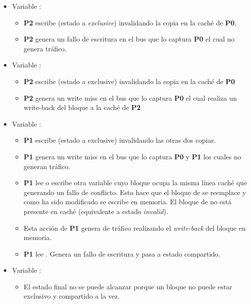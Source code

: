 \begin{itemize}

\item Variable :
  \begin{itemize}
    \item \textbf{\textbf{P2}}  escribe  (estado a \emph{exclusive}) invalidando la copia en la caché de \textbf{P0}.
    \item \textbf{P2} genera un fallo de escritura en el bus que lo captura \textbf{P0} el cual no genera tráfico.
  \end{itemize}

\item Variable :
  \begin{itemize}
    \item \textbf{P2}  escribe   (estado a exclusive) invalidando la copia en la caché de \textbf{P0}
    \item \textbf{P2} genera un write miss en el bus que lo captura \textbf{P0} el cual realiza un write-back del bloque a la caché de \textbf{P2}
  \end{itemize}

\item Variable :
  \begin{itemize}
    \item \textbf{P1} escribe  (estado a exclusive) invalidando las otras dos copias.
    \item \textbf{P1} genera un write miss en el bus que lo captura \textbf{P0} y \textbf{P1} los cuales no generan tráfico.
    \item \textbf{P1} lee o escribe  otra variable cuyo bloque ocupa la misma línea caché que  generando un fallo de conflicto. Esto hace que el bloque de  se reemplace y como ha sido modificado se escribe en memoria. El bloque de  no está presente en caché (equivalente a estado \emph{invalid}).
    \item Esta acción de \textbf{P1} genera de tráfico realizando el \emph{write-back} del bloque en memoria.
    \item \textbf{P1} lee . Genera un fallo de escritura y pasa a estado compartido. 
  \end{itemize}

\item Variable :
  \begin{itemize}
    \item El estado final no se puede alcanzar porque un bloque no puede estar exclusivo y compartido a la vez.
  \end{itemize}

\end{itemize}

